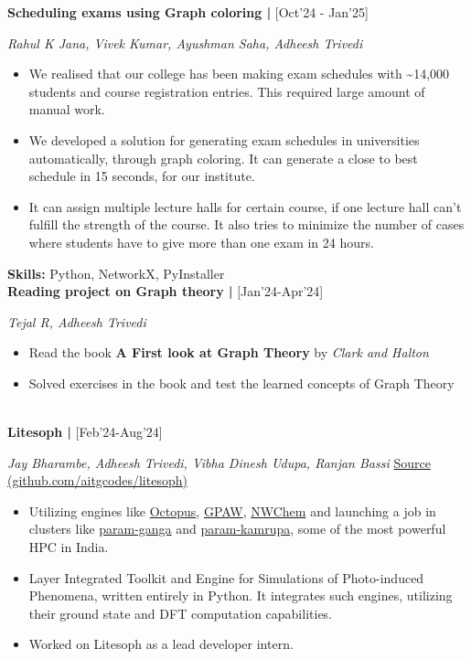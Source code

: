 \textbf{Scheduling exams using Graph coloring | \pptale}\hfill {[Oct’24 - Jan'25]}

\textit{Rahul K Jana, Vivek Kumar, Ayushman Saha, Adheesh Trivedi}

\begin{itemize}
    \item We realised that our college has been making exam schedules with \textasciitilde14,000
    students and course registration entries. This required large amount of manual work.
    \item We developed a solution for generating exam schedules in universities automatically,
    through graph coloring. It can generate a close to best schedule in 15 seconds, for our institute.
    \item It can assign multiple lecture halls for certain course, if one lecture hall can't
    fulfill the strength of the course. It also tries to minimize the number of cases where
    students have to give more than one exam in 24 hours.
\end{itemize}

\textbf{Skills:} Python, NetworkX, PyInstaller
\\


\textbf{Reading project on Graph theory | \pptale}\hfill {[Jan'24-Apr'24]}

\textit{Tejal R, Adheesh Trivedi}

\begin{itemize}
    \item Read the book \textbf{A First look at Graph Theory} by \textit{Clark and Halton}
    \item Solved exercises in the book and test the learned concepts of Graph Theory
\end{itemize}


\\


\textbf{Litesoph | \vardha}\hfill {[Feb'24-Aug’24]}

\textit{Jay Bharambe, Adheesh Trivedi, Vibha Dinesh Udupa, Ranjan Bassi}
    \hfill \href{https://github.com/aitgcodes/litesoph}
    {Source (github.com/aitgcodes/litesoph)}

\begin{itemize}
    \item Utilizing engines like \href{www.octopus-code.org}{Octopus},
    \href{gpaw.readthedocs.io}{GPAW}, \href{www.nwchem-sw.org}{NWChem}
    and launching a job in clusters like \href{hpc.iitr.ac.in}{param-ganga}
    and \href{www.iitg.ac.in/hpc/home}{param-kamrupa}, some of the most powerful
    HPC in India.
    \item Layer Integrated Toolkit and Engine for Simulations of Photo-induced Phenomena, written entirely in Python.
    It integrates such engines, utilizing their ground state and DFT computation capabilities.
    \item Worked on Litesoph as a lead developer intern.
\end{itemize}

